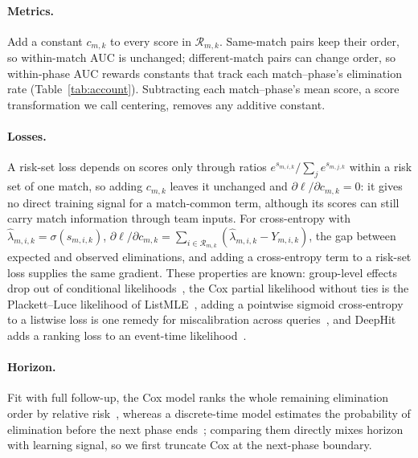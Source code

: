 \documentclass[sigconf,anonymous,nonacm]{acmart}
\begin{document}
\paragraph{Metrics.}
Add a constant $c_{m,k}$ to every score in $\mathcal{R}_{m,k}$. Same-match pairs keep their order, so within-match AUC is unchanged; different-match pairs can change order, so within-phase AUC rewards constants that track each match--phase's elimination rate (Table~\ref{tab:account}). Subtracting each match--phase's mean score, a score transformation we call centering, removes any additive constant.

\paragraph{Losses.}
A risk-set loss depends on scores only through ratios $e^{s_{m,i,k}}/\sum_{j}e^{s_{m,j,k}}$ within a risk set of one match, so adding $c_{m,k}$ leaves it unchanged and $\partial\ell/\partial c_{m,k}=0$: it gives no direct training signal for a match-common term, although its scores can still carry match information through team inputs. For cross-entropy with $\hat\lambda_{m,i,k}=\sigma(s_{m,i,k})$, $\partial\ell/\partial c_{m,k}=\sum_{i\in\mathcal{R}_{m,k}}(\hat\lambda_{m,i,k}-Y_{m,i,k})$, the gap between expected and observed eliminations, and adding a cross-entropy term to a risk-set loss supplies the same gradient. These properties are known: group-level effects drop out of conditional likelihoods~\cite{Chamberlain80}, the Cox partial likelihood without ties is the Plackett--Luce likelihood of ListMLE~\cite{Xia08}, adding a pointwise sigmoid cross-entropy to a listwise loss is one remedy for miscalibration across queries~\cite{Bai23}, and DeepHit adds a ranking loss to an event-time likelihood~\cite{DeepHit18}.

\paragraph{Horizon.}
Fit with full follow-up, the Cox model ranks the whole remaining elimination order by relative risk~\cite{Cox72}, whereas a discrete-time model estimates the probability of elimination before the next phase ends~\cite{SingerWillett93}; comparing them directly mixes horizon with learning signal, so we first truncate Cox at the next-phase boundary.
\end{document}
